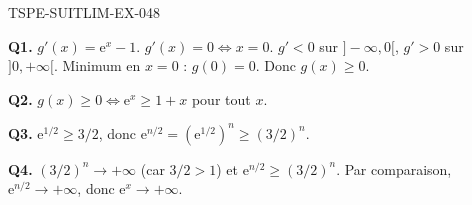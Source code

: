\begin{corrige}{TSPE-SUITLIM-EX-048}

\textbf{Q1.} $g'(x) = \mathrm{e}^x - 1$. $g'(x) = 0 \iff x = 0$. $g'<0$ sur $]-\infty,0[$, $g'>0$ sur $]0,+\infty[$. Minimum en $x=0$ : $g(0) = 0$. Donc $g(x) \geq 0$.

\textbf{Q2.} $g(x) \geq 0 \iff \boxed{\mathrm{e}^x \geq 1+x}$ pour tout $x$.

\textbf{Q3.} $\mathrm{e}^{1/2} \geq 3/2$, donc $\mathrm{e}^{n/2} = (\mathrm{e}^{1/2})^n \geq (3/2)^n$.

\textbf{Q4.} $(3/2)^n \to +\infty$ (car $3/2>1$) et $\mathrm{e}^{n/2} \geq (3/2)^n$. Par comparaison, $\mathrm{e}^{n/2} \to +\infty$, donc $\mathrm{e}^x \to +\infty$.

\end{corrige}
